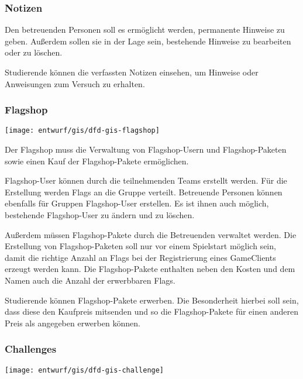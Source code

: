 \subsubsection{Notizen}

Den betreuenden Personen soll es ermöglicht werden, permanente Hinweise zu geben. Außerdem sollen sie in der Lage sein, bestehende Hinweise zu bearbeiten oder zu löschen.

Studierende können die verfassten Notizen einsehen, um Hinweise oder Anweisungen zum Versuch zu erhalten.

\subsubsection{Flagshop}
\begin{center}
	\texttt{[image: entwurf/gis/dfd-gis-flagshop]}
\end{center}

Der Flagshop muss die Verwaltung von Flagshop-Usern und Flagshop-Paketen sowie einen Kauf der Flagshop-Pakete ermöglichen.

Flagshop-User können durch die teilnehmenden Teams erstellt werden. Für die Erstellung werden Flags an die Gruppe verteilt. Betreuende Personen können ebenfalls für Gruppen Flagshop-User erstellen. Es ist ihnen auch möglich, bestehende Flagshop-User zu ändern und zu löschen.

Außerdem müssen Flagshop-Pakete durch die Betreuenden verwaltet werden. Die Erstellung von Flagshop-Paketen soll nur vor einem Spielstart möglich sein, damit die richtige Anzahl an Flags bei der Registrierung eines GameClients erzeugt werden kann. Die Flagshop-Pakete enthalten neben den Kosten und dem Namen auch die Anzahl der erwerbbaren Flags.

Studierende können Flagshop-Pakete erwerben. Die Besonderheit hierbei soll sein, dass diese den Kaufpreis mitsenden und so die Flagshop-Pakete für einen anderen Preis als angegeben erwerben können.

\subsubsection{Challenges}
\begin{center}
	\texttt{[image: entwurf/gis/dfd-gis-challenge]}
\end{center}

